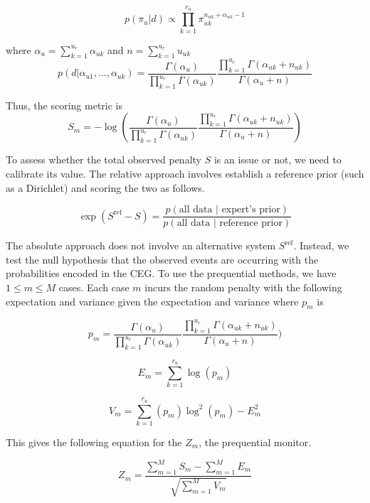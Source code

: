\documentclass[12pt]{article}
\begin{document}
\[
p(\pi_u | d) \propto \prod_{k=1}^{r_u} \pi_{uk}^{n_{uk} +\alpha_{uk} -1}
\]

where $\alpha_u = \sum_{k=1}^{u_r} \alpha_{uk}$ and $n = \sum_{k=1}^{u_r} u_{uk}$ 
\[
p(d | \alpha_{u1}, \ldots, \alpha_{uk}) = \frac{\Gamma(\alpha_u)}{\prod_{k=1}^{u_r} \Gamma(\alpha_{uk})} \frac{\prod_{k=1}^{u_r}\Gamma(\alpha_{uk} + n_{uk})}{\Gamma(\alpha_u + n)}
\]

Thus, the scoring metric is 
\[
S_m = -\log \left(\frac{\Gamma(\alpha_u)}{\prod_{k=1}^{u_r} \Gamma(\alpha_{uk})} \frac{\prod_{k=1}^{u_r}\Gamma(\alpha_{uk} + n_{uk})}{\Gamma(\alpha_u + n)}\right)
\]

To assess whether the total observed penalty $S$ is an issue or not, we need to calibrate its value. The relative approach involves establish a reference prior (such as a Dirichlet) and scoring the two as follows.

\[
\exp(S^{\text{ref}} - S) = \frac{p(\text{all data } | \text{ expert's prior})}{p(\text{all data } | \text{ reference prior})}
\]


The absolute approach does not involve an alternative system $S^{\text{ref}}$. Instead, we test the null hypothesis that the observed events are occurring with the probabilities encoded in the CEG. To use the prequential methods, we have $1 \leq m \leq M$ cases. Each case $m$  incurs the random penalty with the following expectation and variance given the expectation and variance where $p_m$ is 

\begin{equation}
p_m= \frac{\Gamma(\alpha_u)}{\prod_{k=1}^{u_r} \Gamma(\alpha_{uk})} \frac{\prod_{k=1}^{u_r}\Gamma(\alpha_{uk} + n_{uk})}{\Gamma(\alpha_u + n)})
\end{equation}

\begin{equation}
E_m = \sum_{k=1}^{r_u}  \log (p_m)
\end{equation} 

\begin{equation}
V_m = \sum_{k=1}^{r_u} (p_m) \log^2 (p_m) - E_m^2
\end{equation}

This gives the following equation for the $Z_m$, the prequential monitor. 

\[
Z_m = \frac{\sum_{m=1}^{M} S_m - \sum_{m=1}^{M} E_m}{\sqrt{\sum_{m=1}^{M} V_m}}
\]

%
%
%
\end{document}

